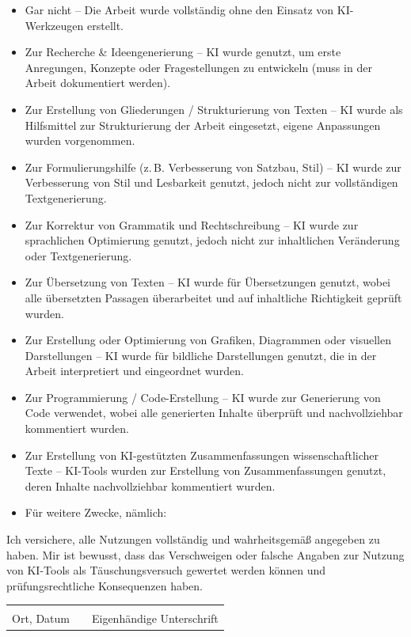 \begin{itemize}
    \item[\Square] Gar nicht – Die Arbeit wurde vollständig ohne den Einsatz von KI-Werkzeugen erstellt.
    \item[\Square] Zur Recherche \& Ideengenerierung – KI wurde genutzt, um erste Anregungen, Konzepte oder Fragestellungen zu entwickeln (muss in der Arbeit dokumentiert werden).
    \item[\Square] Zur Erstellung von Gliederungen / Strukturierung von Texten – KI wurde als Hilfsmittel zur Strukturierung der Arbeit eingesetzt, eigene Anpassungen wurden vorgenommen.
    \item[\Square] Zur Formulierungshilfe (z.\,B. Verbesserung von Satzbau, Stil) – KI wurde zur Verbesserung von Stil und Lesbarkeit genutzt, jedoch nicht zur vollständigen Textgenerierung.
    \item[\Square] Zur Korrektur von Grammatik und Rechtschreibung – KI wurde zur sprachlichen Optimierung genutzt, jedoch nicht zur inhaltlichen Veränderung oder Textgenerierung.
    \item[\Square] Zur Übersetzung von Texten – KI wurde für Übersetzungen genutzt, wobei alle übersetzten Passagen überarbeitet und auf inhaltliche Richtigkeit geprüft wurden.
    \item[\Square] Zur Erstellung oder Optimierung von Grafiken, Diagrammen oder visuellen Darstellungen – KI wurde für bildliche Darstellungen genutzt, die in der Arbeit interpretiert und eingeordnet wurden.
    \item[\Square] Zur Programmierung / Code-Erstellung – KI wurde zur Generierung von Code verwendet, wobei alle generierten Inhalte überprüft und nachvollziehbar kommentiert wurden.
    \item[\Square] Zur Erstellung von KI-gestützten Zusammenfassungen wissenschaftlicher Texte – KI-Tools wurden zur Erstellung von Zusammenfassungen genutzt, deren Inhalte nachvollziehbar kommentiert wurden.
    \item[\Square] Für weitere Zwecke, nämlich: \hrulefill
\end{itemize}

Ich versichere, alle Nutzungen vollständig und wahrheitsgemäß angegeben zu haben. Mir ist bewusst, dass das Verschweigen oder falsche Angaben zur Nutzung von KI-Tools als Täuschungsversuch gewertet werden können und prüfungsrechtliche Konsequenzen haben.

\vspace{1.5cm}

\noindent
\begin{tabular}{@{}p{6cm} p{2cm} p{7cm}@{}} 
    \hrulefill & & \hrulefill \\ 
    Ort, Datum & & Eigenhändige Unterschrift
\end{tabular}

\cleardoublepage